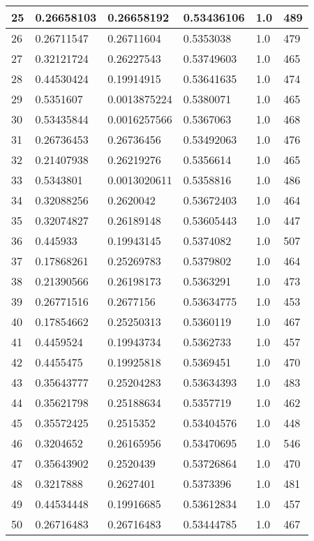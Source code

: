\begin{longtable}{|l|l|l|l|l|l|}
25 & 0.26658103 & 0.26658192 & 0.53436106 & 1.0 & 489 \\ \hline 
26 & 0.26711547 & 0.26711604 & 0.5353038 & 1.0 & 479 \\ \hline 
27 & 0.32121724 & 0.26227543 & 0.53749603 & 1.0 & 465 \\ \hline 
28 & 0.44530424 & 0.19914915 & 0.53641635 & 1.0 & 474 \\ \hline 
29 & 0.5351607 & 0.0013875224 & 0.5380071 & 1.0 & 465 \\ \hline 
30 & 0.53435844 & 0.0016257566 & 0.5367063 & 1.0 & 468 \\ \hline 
31 & 0.26736453 & 0.26736456 & 0.53492063 & 1.0 & 476 \\ \hline 
32 & 0.21407938 & 0.26219276 & 0.5356614 & 1.0 & 465 \\ \hline 
33 & 0.5343801 & 0.0013020611 & 0.5358816 & 1.0 & 486 \\ \hline 
34 & 0.32088256 & 0.2620042 & 0.53672403 & 1.0 & 464 \\ \hline 
35 & 0.32074827 & 0.26189148 & 0.53605443 & 1.0 & 447 \\ \hline 
36 & 0.445933 & 0.19943145 & 0.5374082 & 1.0 & 507 \\ \hline 
37 & 0.17868261 & 0.25269783 & 0.5379802 & 1.0 & 464 \\ \hline 
38 & 0.21390566 & 0.26198173 & 0.5363291 & 1.0 & 473 \\ \hline 
39 & 0.26771516 & 0.2677156 & 0.53634775 & 1.0 & 453 \\ \hline 
40 & 0.17854662 & 0.25250313 & 0.5360119 & 1.0 & 467 \\ \hline 
41 & 0.4459524 & 0.19943734 & 0.5362733 & 1.0 & 457 \\ \hline 
42 & 0.4455475 & 0.19925818 & 0.5369451 & 1.0 & 470 \\ \hline 
43 & 0.35643777 & 0.25204283 & 0.53634393 & 1.0 & 483 \\ \hline 
44 & 0.35621798 & 0.25188634 & 0.5357719 & 1.0 & 462 \\ \hline 
45 & 0.35572425 & 0.2515352 & 0.53404576 & 1.0 & 448 \\ \hline 
46 & 0.3204652 & 0.26165956 & 0.53470695 & 1.0 & 546 \\ \hline 
47 & 0.35643902 & 0.2520439 & 0.53726864 & 1.0 & 470 \\ \hline 
48 & 0.3217888 & 0.2627401 & 0.5373396 & 1.0 & 481 \\ \hline 
49 & 0.44534448 & 0.19916685 & 0.53612834 & 1.0 & 457 \\ \hline 
50 & 0.26716483 & 0.26716483 & 0.53444785 & 1.0 & 467 \\ \hline 
\end{longtable}
